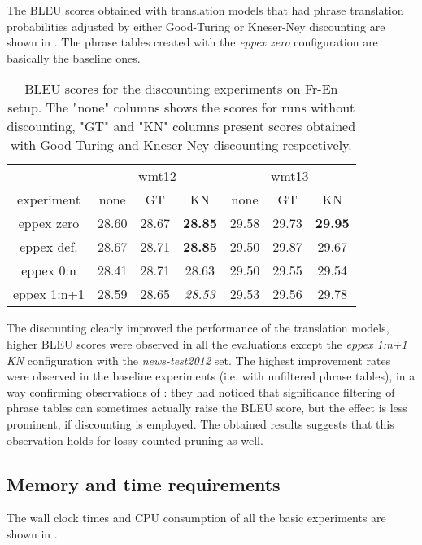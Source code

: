 The BLEU scores obtained with translation models that had phrase translation probabilities
adjusted by either Good-Turing or Kneser-Ney discounting are shown in .
The phrase tables created with the \emph{eppex zero} configuration are basically the
baseline ones.

\begin{table}[ht]
\centering
\begin{tabular}{ | c | c c c | c c c | }
\hline
 & \multicolumn{3}{|c|}{wmt12} & \multicolumn{3}{|c|}{wmt13} \\
experiment & none & GT & KN & none & GT & KN \\
\hline
\hline
eppex zero    & 28.60 & 28.67 & \textbf{28.85} & 29.58 & 29.73 & \textbf{29.95} \\
eppex def.    & 28.67 & 28.71 & \textbf{28.85} & 29.50 & 29.87 & 29.67 \\
eppex 0:n     & 28.41 & 28.71 & 28.63 & 29.50 & 29.55 & 29.54 \\
eppex 1:n+1   & 28.59 & 28.65 & \emph{28.53} & 29.53 & 29.56 & 29.78 \\
\hline
\end{tabular}
\caption{\label{fr-en-smoothed-bleu}
BLEU scores for the discounting experiments on Fr-En setup.
The "none" columns shows the scores for runs without discounting, "GT" and "KN" columns
present scores obtained with Good-Turing and Kneser-Ney discounting respectively.}
\end{table}

The discounting clearly improved the performance of the translation models,
higher BLEU scores were observed in all the evaluations except the \emph{eppex 1:n+1 KN}
configuration with the \emph{news-test2012} set.
The highest improvement rates were observed in the baseline experiments (i.e. with unfiltered
phrase tables), in a way confirming observations of \citet{johnson:sigfilter}:
they had noticed that significance filtering of phrase tables can sometimes actually raise
the BLEU score, but the effect is less prominent, if discounting is employed.
The obtained results suggests that this observation holds for lossy-counted pruning as well.

\subsection{Memory and time requirements}

The wall clock times and CPU consumption of all the basic experiments are shown
in .

